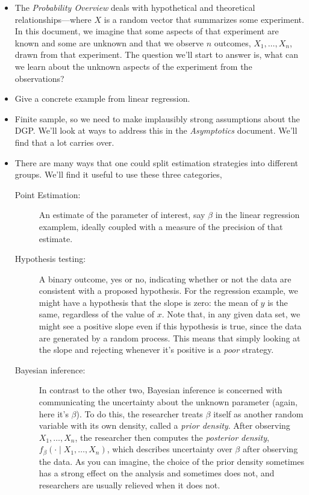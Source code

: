 \begin{itemize}[leftmargin=0pt]

\item The \emph{Probability Overview} deals with hypothetical and
  theoretical relationships---where $X$ is a random vector that
  summarizes some experiment.  In this document, we imagine that some
  aspects of that experiment are known and some are unknown and that
  we observe $n$ outcomes, $X_1,\dots,X_n$, drawn from that experiment.
  The question we'll start to answer is, what can we learn about the
  unknown aspects of the experiment from the observations?

\item Give a concrete example from linear regression.

\item Finite sample, so we need to make implausibly strong assumptions
  about the DGP.  We'll look at ways to address this in the
  \emph{Asymptotics} document.  We'll find that a lot carries over.

\item There are many ways that one could split estimation strategies
  into different groups.  We'll find it useful to use these three
  categories,
  \begin{description}
  \item[Point Estimation:] An estimate of the parameter of interest,
    say $\beta$ in the linear regression examplem, ideally coupled with a
    measure of the precision of that estimate.

  \item[Hypothesis testing:] A binary outcome, yes or no, indicating
    whether or not the data are consistent with a proposed
    hypothesis.  For the regression example, we might have a
    hypothesis that the slope is zero: the mean of $y$ is the same,
    regardless of the value of $x$.  Note that, in any given data set,
    we might see a positive slope even if this hypothesis is true,
    since the data are generated by a random process.  This means that
    simply looking at the slope and rejecting whenever it's positive
    is a \emph{poor} strategy.

  \item[Bayesian inference:] In contrast to the other two, Bayesian
    inference is concerned with communicating the uncertainty about
    the unknown parameter (again, here it's $\beta$).  To do this, the
    researcher treats $\beta$ itself as another random variable with its
    own density, called a \emph{prior density}.  After observing
    $X_1,\dots,X_n$, the researcher then computes the \emph{posterior
      density}, $f_\beta(\cdot \mid X_1,\dots,X_n)$, which describes
    uncertainty over $\beta$ after observing the data.  As you can
    imagine, the choice of the prior density sometimes has a strong
    effect on the analysis and sometimes does not, and researchers are
    usually relieved when it does not.


\end{description}
\end{itemize}
